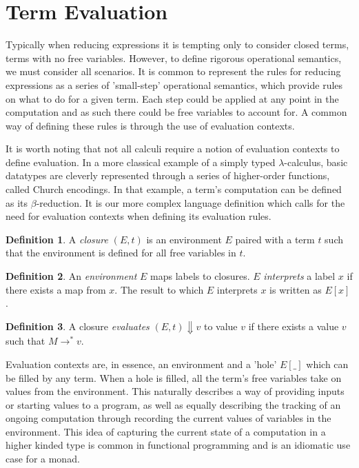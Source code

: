 \documentclass[12pt,a4paper]{report}
\theoremstyle{definition}
\theoremstyle{definition}
\newtheorem{definition}{Definition}[chapter]%
\theoremstyle{remark}
\begin{document}
\section{Term Evaluation}\label{section: evaluation}
Typically when reducing expressions it is tempting only to consider closed terms, terms with no free variables. However, to define rigorous operational semantics, we must consider all scenarios. It is common to represent the rules for reducing expressions as a series of 'small-step' operational semantics, which provide rules on what to do for a given term. Each step could be applied at any point in the computation and as such there could be free variables to account for. A common way of defining these rules is through the use of evaluation contexts.

It is worth noting that not all calculi require a notion of evaluation contexts to define evaluation. In a more classical example of a simply typed $\lambda$-calculus, basic datatypes are cleverly represented through a series of higher-order functions, called Church encodings. In that example, a term's computation can be defined as its $\beta$-reduction. It is our more complex language definition which calls for the need for evaluation contexts when defining its evaluation rules.

\begin{definition}
    A \emph{closure} $(E, t)$ is an environment $E$ paired with a term $t$ such that the environment is defined for all free variables in $t$.
\end{definition}

\begin{definition}\label{def: environment}
    An \emph{environment} $E$ maps labels to closures. $E$ \emph{interprets} a label $x$ if there exists a map from $x$. The result to which $E$ interprets $x$ is written as $E[x]$.
\end{definition}

\begin{definition}
    A closure \emph{evaluates} $(E, t) \Downarrow v$ to value $v$ if there exists a value $v$ such that $M \rightarrow^* v$.
\end{definition}

Evaluation contexts are, in essence, an environment and a 'hole' $E[\_]$ which can be filled by any term. When a hole is filled, all the term's free variables take on values from the environment. This naturally describes a way of providing inputs or starting values to a program, as well as equally describing the tracking of an ongoing computation through recording the current values of variables in the environment. This idea of capturing the current state of a computation in a higher kinded type is common in functional programming and is an idiomatic use case for a monad.
\end{document}

